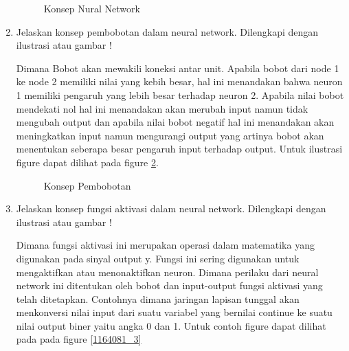 \begin{enumerate}
\begin{figure}[!htbp]
		\caption{Konsep Nural Network}
		\label{1164081_1}
	\end{figure}
\item Jelaskan konsep pembobotan dalam neural network. Dilengkapi dengan ilustrasi atau gambar !
\par
Dimana Bobot akan mewakili koneksi antar unit. Apabila bobot dari node 1 ke node 2 memiliki nilai yang kebih besar, hal ini menandakan bahwa neuron 1 memiliki pengaruh yang lebih besar terhadap neuron 2. Apabila nilai bobot mendekati nol hal ini menandakan akan merubah input namun tidak mengubah output dan apabila nilai bobot negatif hal ini menandakan akan meningkatkan input namun mengurangi output yang artinya bobot akan menentukan seberapa besar pengaruh input terhadap output. Untuk ilustrasi figure dapat dilihat pada figure \ref{1164081_2}.
	\begin{figure}[!htbp]
		\caption{Konsep Pembobotan}
		\label{1164081_2}
	\end{figure}	
\item Jelaskan konsep fungsi aktivasi dalam neural network. Dilengkapi dengan ilustrasi atau gambar !
\par
Dimana fungsi aktivasi ini merupakan operasi dalam matematika yang digunakan pada sinyal output y. Fungsi ini sering digunakan untuk mengaktifkan atau menonaktifkan neuron. Dimana perilaku dari neural network ini ditentukan oleh bobot dan input-output fungsi aktivasi yang telah ditetapkan. Contohnya dimana jaringan lapisan tunggal akan menkonversi nilai input dari suatu variabel yang bernilai continue ke suatu nilai output biner yaitu angka 0 dan 1. Untuk contoh figure dapat dilihat pada pada figure \ref{1164081_3}
	\begin{figure}[!htbp]

\end{figure}
\end{enumerate}
